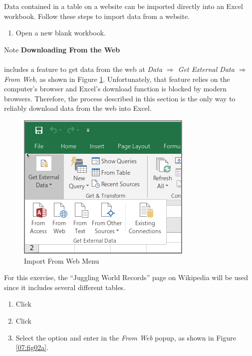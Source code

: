 Data contained in a table on a website can be imported directly into an Excel workbook. Follow these steps to import data from a website.

\begin{enumerate}
	\item Open a new blank workbook.
\end{enumerate}

\begin{center}
	\begin{infobox}{Note}
		\textbf{Downloading From the Web}
		\\
		\\
		 includes a feature to get data from the web at \textit{Data $ \Rightarrow $ Get External Data $ \Rightarrow $ From Web}, as shown in Figure \ref{07:fig01}. Unfortunately, that feature relies on the computer's browser and Excel's download function is blocked by modern browsers. Therefore, the process described in this section is the only way to reliably download data from the web into Excel.
	\end{infobox}
\end{center}

\begin{figure}[H]
	\centering
	\includegraphics[width=\maxwidth{.75\linewidth}]{gfx/ch07_fig01}
	\caption{Import From Web Menu}
	\label{07:fig01}
\end{figure}

For this exercise, the ``Juggling World Records'' page on Wikipedia will be used since it includes several different tables.

\begin{enumerate}[resume]
	\item {} Click 
	\item {} Click 
	\item Select the  option and enter  in the \textit{From Web} popup, as shown in Figure \ref{07:fig02a}.
\end{enumerate}
	
